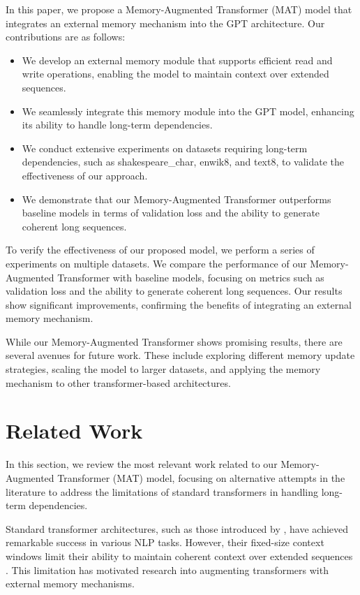 \documentclass{article} %
\begin{document}
In this paper, we propose a Memory-Augmented Transformer (MAT) model that integrates an external memory mechanism into the GPT architecture. Our contributions are as follows:
\begin{itemize}
    \item We develop an external memory module that supports efficient read and write operations, enabling the model to maintain context over extended sequences.
    \item We seamlessly integrate this memory module into the GPT model, enhancing its ability to handle long-term dependencies.
    \item We conduct extensive experiments on datasets requiring long-term dependencies, such as shakespeare\_char, enwik8, and text8, to validate the effectiveness of our approach.
    \item We demonstrate that our Memory-Augmented Transformer outperforms baseline models in terms of validation loss and the ability to generate coherent long sequences.
\end{itemize}

To verify the effectiveness of our proposed model, we perform a series of experiments on multiple datasets. We compare the performance of our Memory-Augmented Transformer with baseline models, focusing on metrics such as validation loss and the ability to generate coherent long sequences. Our results show significant improvements, confirming the benefits of integrating an external memory mechanism.

While our Memory-Augmented Transformer shows promising results, there are several avenues for future work. These include exploring different memory update strategies, scaling the model to larger datasets, and applying the memory mechanism to other transformer-based architectures.

\section{Related Work}
\label{sec:related}

In this section, we review the most relevant work related to our Memory-Augmented Transformer (MAT) model, focusing on alternative attempts in the literature to address the limitations of standard transformers in handling long-term dependencies.

Standard transformer architectures, such as those introduced by \citet{vaswani2017attention}, have achieved remarkable success in various NLP tasks. However, their fixed-size context windows limit their ability to maintain coherent context over extended sequences \citep{Kitaev2020ReformerTE}. This limitation has motivated research into augmenting transformers with external memory mechanisms.
\end{document}
